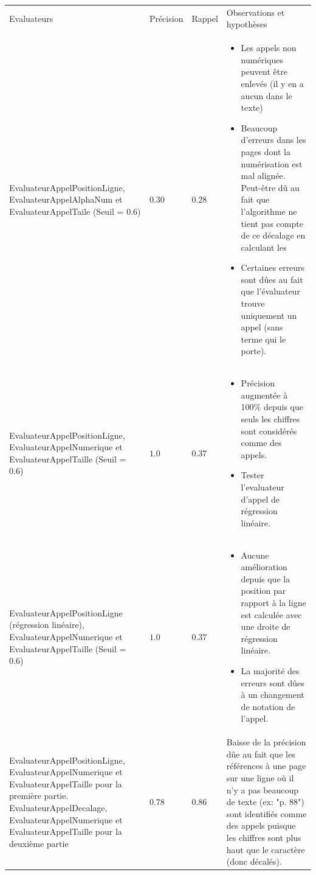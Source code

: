 \begin{table}
\begin{tabular}{| p{6cm} | p{2cm} | p{1.25cm} | p{6cm} |}
    \hline
    \rowcolor[gray]{0.9}
    Evaluateurs & Précision & Rappel & Observations et hypothèses \\
    EvaluateurAppelPositionLigne, EvaluateurAppelAlphaNum et EvaluateurAppelTaile (Seuil = 0.6)
    & $0.30$ & $0.28$ & 
    \begin{itemize}
        \item Les appels non numériques peuvent être enlevés (il y en a aucun dans le texte)
        \item Beaucoup d'erreurs dans les pages dont la numérisation est mal alignée. Peut-être dû au fait que l'algorithme ne tient pas compte de ce décalage en calculant les 
        \item Certaines erreurs sont dûes au fait que l'évaluateur trouve uniquement un appel (sans terme qui le porte).
        \end{itemize}  \\ \hline
        EvaluateurAppelPositionLigne,
        EvaluateurAppelNumerique et 
        EvaluateurAppelTaille (Seuil = 0.6)
    & $1.0$ & $0.37$ &
    \begin{itemize}
        \item Précision augmentée à 100\% depuis que seuls les chiffres sont considérés comme des appels.
        \item Tester l'evaluateur d'appel de régression linéaire.
    \end{itemize} \\
    \hline
        EvaluateurAppelPositionLigne (régression linéaire),
        EvaluateurAppelNumerique et
        EvaluateurAppelTaille (Seuil = 0.6)
    & $1.0$ & $0.37$ &
    \begin{itemize}
        \item Aucune amélioration depuis que la position par rapport à la ligne est calculée avec une droite de régression linéaire. 
        \item La majorité des erreurs sont dûes à un changement de notation de l'appel. 
    \end{itemize}
        \\ \hline
    EvaluateurAppelPositionLigne, EvaluateurAppelNumerique et EvaluateurAppelTaille pour la première partie. EvaluateurAppelDecalage, EvaluateurAppelNumerique et EvaluateurAppelTaille pour la deuxième partie &
    $0.78$ & $0.86$ &
    Baisse de la précision dûe au fait que les références à une page sur une ligne où il n'y a pas beaucoup de texte (ex: "p. 88") sont identifiés comme des appels puisque les chiffres sont plus haut que le caractère (donc décalés).

\end{tabular}
\end{table}
